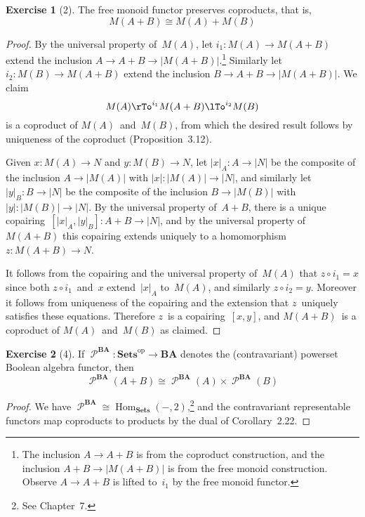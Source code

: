 \documentclass[letterpaper,12pt]{article}
\newcommand{\iso}{\cong}
\newcommand{\after}{\circ}
\DeclareMathOperator{\Hom}{Hom}
\DeclareMathOperator{\pow}{\mathcal{P}}
\newcommand{\copair}[2]{[{#1},{#2}]}
\newcommand{\cat}[1]{\mathbf{#1}}
\newcommand{\dual}[1]{#1^{\mathrm{op}}}
\newcommand{\under}[1]{|{#1}|}
\newcommand{\Sets}{\cat{Sets}}
\newcommand{\Setsop}{\dual{\Sets}}
\newcommand{\BA}{\cat{BA}}
\newcommand{\powBA}{\pow^{\BA}}
\theoremstyle{definition}
\newtheorem*{exer}{Exercise}
\theoremstyle{remark}
\theoremstyle{direction}
\begin{document}
\begin{exer}[2]
The free monoid functor preserves coproducts, that is,
\[M(A+B)\iso M(A)+M(B)\]
\end{exer}
\begin{proof}
By the universal property of~\(M(A)\), let \(i_1:M(A)\to M(A+B)\) extend the inclusion \(A\to A+B\to\under{M(A+B)}\).\footnote{The inclusion \(A\to A+B\) is from the coproduct construction, and the inclusion \(A+B\to\under{M(A+B)}\) is from the free monoid construction. Observe \(A\to A+B\) is lifted to~\(i_1\) by the free monoid functor.} Similarly let \(i_2:M(B)\to M(A+B)\) extend the inclusion \(B\to A+B\to\under{M(A+B)}\). We claim
\[M(A)\rTo^{i_1}M(A+B)\lTo^{i_2}M(B)\]
is a coproduct of \(M(A)\)~and~\(M(B)\), from which the desired result follows by uniqueness of the coproduct (Proposition~3.12).

Given \(x:M(A)\to N\) and \(y:M(B)\to N\), let \(\under{x}_A:A\to\under{N}\) be the composite of the inclusion \(A\to\under{M(A)}\) with \(\under{x}:\under{M(A)}\to\under{N}\), and similarly let \(\under{y}_B:B\to\under{N}\) be the composite of the inclusion \(B\to\under{M(B)}\) with \(\under{y}:\under{M(B)}\to\under{N}\). By the universal property of~\(A+B\), there is a unique copairing~\(\copair{\under{x}_A}{\under{y}_B}:A+B\to\under{N}\), and by the universal property of~\(M(A+B)\) this copairing extends uniquely to a homomorphism \(z:M(A+B)\to N\).

It follows from the copairing and the universal property of~\(M(A)\) that \(z\after i_1=x\) since both \(z\after i_1\)~and~\(x\) extend~\(\under{x}_A\) to~\(M(A)\), and similarly \(z\after i_2=y\). Moreover it follows from uniqueness of the copairing and the extension that \(z\)~uniquely satisfies these equations. Therefore \(z\)~is a copairing~\(\copair{x}{y}\), and \(M(A+B)\)~is a coproduct of \(M(A)\)~and~\(M(B)\) as claimed.
\end{proof}

\begin{exer}[4]
If \(\powBA:\Setsop\to\BA\) denotes the (contravariant) powerset Boolean algebra functor, then
\[\powBA(A+B)\iso\powBA(A)\times\powBA(B)\]
\end{exer}
\begin{proof}
We have \(\powBA\iso\Hom_{\Sets}(-,2)\),\footnote{See Chapter~7.} and the contravariant representable functors map coproducts to products by the dual of Corollary~2.22.
\end{proof}
\end{document}
